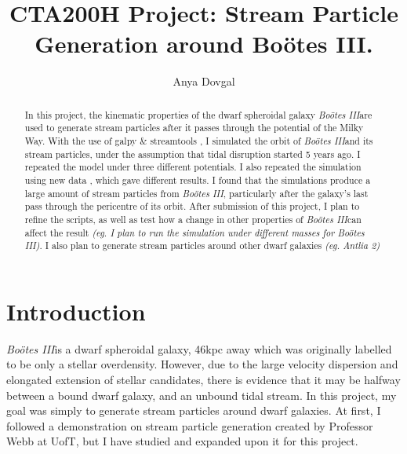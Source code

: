 \documentclass[12pt]{article}
\newcommand{\boo}{\textit{Bo\"{o}tes III}}
\begin{document}
\title{CTA200H Project: Stream Particle Generation around Bo\"{o}tes III.}
 
\author{Anya Dovgal}
\maketitle 


\begin{abstract}
In this project, the kinematic properties of the dwarf spheroidal galaxy \boo are used to generate stream particles after it passes through the potential of the Milky Way. With the use of galpy \& streamtools \cite{Bovy_2015}, I simulated the orbit of \boo and its stream particles, under the assumption that tidal disruption started 5 years ago. I repeated the model under three different potentials. I also repeated the simulation using new data \cite{Pace_6D}, which gave different results. I found that the simulations produce a large amount of stream particles from \boo, particularly after the galaxy's last pass through the pericentre of its orbit.
After submission of this project, I plan to refine the scripts, as well as test how a change in other properties of \boo can affect the result \textit{(eg. I plan to run the simulation under different masses for \boo)}. I also plan to generate stream particles around other dwarf galaxies \textit{(eg. Antlia 2)}
\end{abstract}





\section{Introduction}
\label{sec:intro}

\boo is a dwarf spheroidal galaxy, 46kpc away \cite{Carlin_2009} which was originally labelled to be only a stellar overdensity. However, due to the large velocity dispersion and elongated extension of stellar candidates, there is evidence \cite{Carlin_2009} that it may be halfway between a bound dwarf galaxy, and an unbound tidal stream. In this project, my goal was simply to generate stream particles around dwarf galaxies. At first, I followed a demonstration on stream particle generation created by Professor Webb at UofT, but I have studied and expanded upon it for this project.
\end{document}

